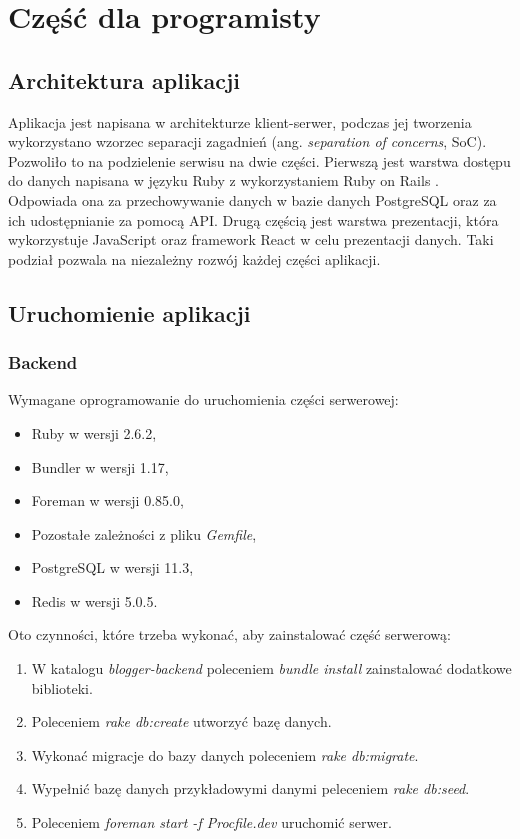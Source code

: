 \documentclass[declaration,shortabstract,polish,inz]{iithesis}
\begin{document}
\chapter{Część dla programisty}
\section{Architektura aplikacji}
Aplikacja jest napisana w architekturze klient-serwer, podczas jej tworzenia wykorzystano wzorzec separacji zagadnień (ang. \textit{separation of concerns}, SoC). Pozwoliło to na podzielenie serwisu na dwie części. Pierwszą jest warstwa dostępu do danych napisana w języku Ruby \cite{ruby} z wykorzystaniem Ruby on Rails \cite{ror}. Odpowiada ona za przechowywanie danych w bazie danych PostgreSQL \cite{postgre} oraz za ich udostępnianie za pomocą API. Drugą częścią jest warstwa prezentacji, która wykorzystuje JavaScript oraz framework React \cite{react} w celu prezentacji danych. Taki podział pozwala na niezależny rozwój każdej części aplikacji.

\section{Uruchomienie aplikacji}

\subsection{Backend}
Wymagane oprogramowanie do uruchomienia części serwerowej:
        \begin{itemize}
            \item Ruby w wersji 2.6.2,
            \item Bundler \cite{bundler} w wersji 1.17,
            \item Foreman \cite{foreman} w wersji 0.85.0,
            \item Pozostałe zależności z pliku \textit{Gemfile},
            \item PostgreSQL w wersji 11.3,
            \item Redis \cite{redis} w wersji 5.0.5.
        \end{itemize}

Oto czynności, które trzeba wykonać, aby zainstalować część serwerową:
\begin{enumerate}
    \item W katalogu \textit{blogger-backend} poleceniem \textit{bundle install} zainstalować dodatkowe biblioteki.
    \item Poleceniem \textit{rake db:create} utworzyć bazę danych.
    \item Wykonać migracje do bazy danych poleceniem \textit{rake db:migrate}.
    \item Wypełnić bazę danych przykładowymi danymi peleceniem \textit{rake db:seed}.
    \item Poleceniem \textit{foreman start -f Procfile.dev} uruchomić serwer.
\end{enumerate}
\end{document}
